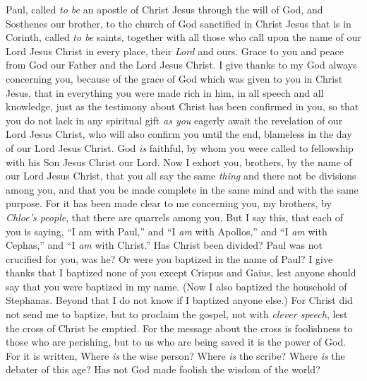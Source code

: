 
\begin{biblechapter} %
 Paul, called \textit{to be} an apostle of Christ Jesus through the will of God, and Sosthenes our brother,
\verse to the church of God sanctified in Christ Jesus that is in Corinth, called \textit{to be} saints, together with all those who call upon the name of our Lord Jesus Christ in every place, their \textit{Lord} and ours.
\verse Grace to you and peace from God our Father and the Lord Jesus Christ.
 I give thanks to my God always concerning you, because of the grace of God which was given to you in Christ Jesus,
\verse that in everything you were made rich in him, in all speech and all knowledge,
\verse just as the testimony about Christ has been confirmed in you,
\verse so that you do not lack in any spiritual gift \textit{as you} eagerly await the revelation of our Lord Jesus Christ,
\verse who will also confirm you until the end, blameless in the day of our Lord Jesus Christ.
\verse God \textit{is} faithful, by whom you were called to fellowship with his Son Jesus Christ our Lord.
 Now I exhort you, brothers, by the name of our Lord Jesus Christ, that you all say the same \textit{thing} and there not be divisions among you, and that you be made complete in the same mind and with the same purpose.
\verse For it has been made clear to me concerning you, my brothers, by \textit{Chloe’s people}, that there are quarrels among you.
\verse But I say this, that each of you is saying, “I am with Paul,” and “I \textit{am} with Apollos,” and “I \textit{am} with Cephas,” and “I \textit{am} with Christ.”
\verse Has Christ been divided? Paul was not crucified for you, was he? Or were you baptized in the name of Paul?
\verse I give thanks that I baptized none of you except Crispus and Gaius,
\verse lest anyone should say that you were baptized in my name.
\verse (Now I also baptized the household of Stephanas. Beyond that I do not know if I baptized anyone else.)
\verse For Christ did not send me to baptize, but to proclaim the gospel, not with \textit{clever speech}, lest the cross of Christ be emptied.
 For the message about the cross is foolishness to those who are perishing, but to us who are being saved it is the power of God.
\verse For it is written,
\verse Where \textit{is} the wise person? Where \textit{is} the scribe? Where \textit{is} the debater of this age? Has not God made foolish the wisdom of the world?

\end{biblechapter}
